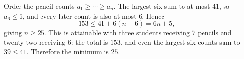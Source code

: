 Order the pencil counts $a_1\ge\cdots\ge a_n$. The largest six sum to at most $41$, so $a_6\le6$, and every later count is also at most $6$. Hence
\[
153\le41+6(n-6)=6n+5,
\]
giving $n\ge25$. This is attainable with three students receiving $7$ pencils and twenty-two receiving $6$: the total is $153$, and even the largest six counts sum to $39\le41$. Therefore the minimum is $\boxed{25}$.
